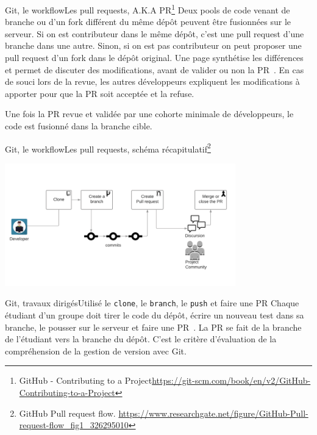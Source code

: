 \documentclass{beamer}
\begin{document}
    \begin{frame}{Git, le workflow}{Les pull requests, A.K.A PR\footnote{GitHub - Contributing to a Project\url{https://git-scm.com/book/en/v2/GitHub-Contributing-to-a-Project}}}
        \transdissolve
        Deux pools de code venant de branche ou d'un fork différent du même dépôt peuvent être fusionnées  sur le serveur.
        \bigbreak
        Si on est contributeur dans le même dépôt, c'est une pull request d'une branche dans une autre.
        Sinon, si on est pas contributeur on peut proposer une pull request d'un fork dans le dépôt original.
        \bigbreak
        Une page synthétise les différences et permet de discuter des modifications, avant de valider ou non la PR~.
        \bigbreak
        En cas de souci lors de la revue, les autres développeurs expliquent les modifications à apporter pour que la PR soit acceptée et la refuse. 

        Une fois la PR revue et validée par une cohorte minimale de développeurs, le code est fusionné dans la branche cible. 
    \end{frame}

    \begin{frame}{Git, le workflow}{Les pull requests, schéma récapitulatif\footnote{GitHub Pull request flow. \url{https://www.researchgate.net/figure/GitHub-Pull-request-flow_fig1_326295010}}}
        \transdissolve
        \begin{center}
            \includegraphics[width=10cm]{image/github-pull-request-flow}
        \end{center}
    \end{frame}

    \begin{frame}{Git, travaux dirigés}{Utilisé le \lstinline{clone}, le \lstinline{branch}, le \lstinline{push} et faire une PR}
        \transdissolve
        Chaque étudiant d'un groupe doit tirer le code du dépôt, écrire un nouveau test dans sa branche, le pousser sur le serveur et faire une PR~.
        \bigbreak
        La PR se fait de la branche de l'étudiant vers la branche  du dépôt.
        \bigbreak
        C'est le critère d'évaluation de la compréhension de la gestion de version avec Git.
    \end{frame}
\end{document}
